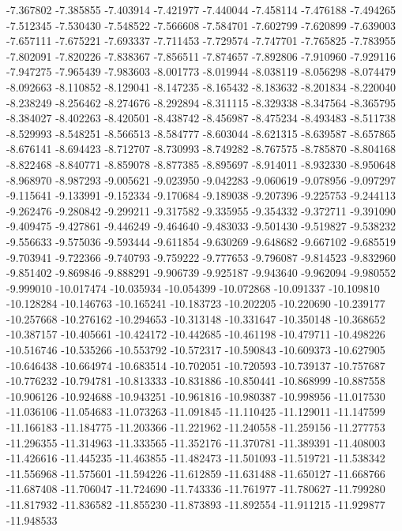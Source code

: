 -7.367802
-7.385855
-7.403914
-7.421977
-7.440044
-7.458114
-7.476188
-7.494265
-7.512345
-7.530430
-7.548522
-7.566608
-7.584701
-7.602799
-7.620899
-7.639003
-7.657111
-7.675221
-7.693337
-7.711453
-7.729574
-7.747701
-7.765825
-7.783955
-7.802091
-7.820226
-7.838367
-7.856511
-7.874657
-7.892806
-7.910960
-7.929116
-7.947275
-7.965439
-7.983603
-8.001773
-8.019944
-8.038119
-8.056298
-8.074479
-8.092663
-8.110852
-8.129041
-8.147235
-8.165432
-8.183632
-8.201834
-8.220040
-8.238249
-8.256462
-8.274676
-8.292894
-8.311115
-8.329338
-8.347564
-8.365795
-8.384027
-8.402263
-8.420501
-8.438742
-8.456987
-8.475234
-8.493483
-8.511738
-8.529993
-8.548251
-8.566513
-8.584777
-8.603044
-8.621315
-8.639587
-8.657865
-8.676141
-8.694423
-8.712707
-8.730993
-8.749282
-8.767575
-8.785870
-8.804168
-8.822468
-8.840771
-8.859078
-8.877385
-8.895697
-8.914011
-8.932330
-8.950648
-8.968970
-8.987293
-9.005621
-9.023950
-9.042283
-9.060619
-9.078956
-9.097297
-9.115641
-9.133991
-9.152334
-9.170684
-9.189038
-9.207396
-9.225753
-9.244113
-9.262476
-9.280842
-9.299211
-9.317582
-9.335955
-9.354332
-9.372711
-9.391090
-9.409475
-9.427861
-9.446249
-9.464640
-9.483033
-9.501430
-9.519827
-9.538232
-9.556633
-9.575036
-9.593444
-9.611854
-9.630269
-9.648682
-9.667102
-9.685519
-9.703941
-9.722366
-9.740793
-9.759222
-9.777653
-9.796087
-9.814523
-9.832960
-9.851402
-9.869846
-9.888291
-9.906739
-9.925187
-9.943640
-9.962094
-9.980552
-9.999010
-10.017474
-10.035934
-10.054399
-10.072868
-10.091337
-10.109810
-10.128284
-10.146763
-10.165241
-10.183723
-10.202205
-10.220690
-10.239177
-10.257668
-10.276162
-10.294653
-10.313148
-10.331647
-10.350148
-10.368652
-10.387157
-10.405661
-10.424172
-10.442685
-10.461198
-10.479711
-10.498226
-10.516746
-10.535266
-10.553792
-10.572317
-10.590843
-10.609373
-10.627905
-10.646438
-10.664974
-10.683514
-10.702051
-10.720593
-10.739137
-10.757687
-10.776232
-10.794781
-10.813333
-10.831886
-10.850441
-10.868999
-10.887558
-10.906126
-10.924688
-10.943251
-10.961816
-10.980387
-10.998956
-11.017530
-11.036106
-11.054683
-11.073263
-11.091845
-11.110425
-11.129011
-11.147599
-11.166183
-11.184775
-11.203366
-11.221962
-11.240558
-11.259156
-11.277753
-11.296355
-11.314963
-11.333565
-11.352176
-11.370781
-11.389391
-11.408003
-11.426616
-11.445235
-11.463855
-11.482473
-11.501093
-11.519721
-11.538342
-11.556968
-11.575601
-11.594226
-11.612859
-11.631488
-11.650127
-11.668766
-11.687408
-11.706047
-11.724690
-11.743336
-11.761977
-11.780627
-11.799280
-11.817932
-11.836582
-11.855230
-11.873893
-11.892554
-11.911215
-11.929877
-11.948533
